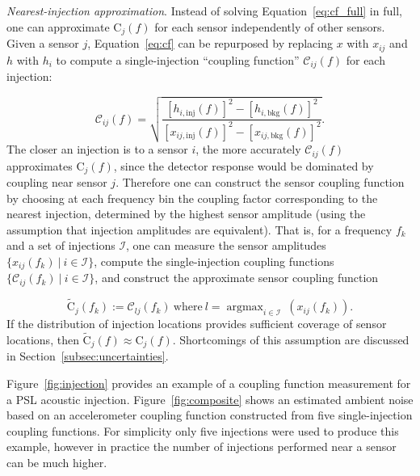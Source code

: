 \textit{Nearest-injection approximation}.
Instead of solving Equation~\ref{eq:cf_full} in full, one can approximate $\mathrm{C}_j(f)$ for each sensor independently of other sensors.
Given a sensor $j$, Equation~\ref{eq:cf} can be repurposed by replacing $x$ with $x_{ij}$ and $h$ with $h_i$ to compute a single-injection ``coupling function'' $\mathcal{C}_{ij}(f)$ for each injection:

\begin{equation}\label{eq:sicf}
	\mathcal{C}_{ij}(f) = \sqrt{\frac{[h_{i,\textrm{inj}}(f)]^2 - [h_{i,\textrm{bkg}}(f)]^2}{[x_{ij,\textrm{inj}}(f)]^2 - [x_{ij,\textrm{bkg}}(f)]^2}}.
\end{equation}
The closer an injection is to a sensor $i$, the more accurately $\mathcal{C}_{ij}(f)$ approximates $\mathrm{C}_j(f)$, since the detector response would be dominated by coupling near sensor $j$.
Therefore one can construct the sensor coupling function by choosing at each frequency bin the coupling factor corresponding to the nearest injection, determined by the highest sensor amplitude (using the assumption that injection amplitudes are equivalent).
That is, for a frequency $f_k$ and a set of injections $\mathcal{I}$, one can measure the sensor amplitudes $\{x_{ij}(f_k)\ |\ i \in \mathcal{I}\}$, compute the single-injection coupling functions $\{\mathcal{C}_{ij}(f_k)\ |\ i \in \mathcal{I}\}$, and construct the approximate sensor coupling function

\begin{equation}\label{eq:ccf}
	\widetilde{\mathrm{C}}_j(f_k) := \mathcal{C}_{lj}(f_k)\ \mathrm{where}\ l = \mathop{argmax}_{i\in\mathcal{I}}\ (x_{ij}(f_k)).
\end{equation}
If the distribution of injection locations provides sufficient coverage of sensor locations, then $\widetilde{\mathrm{C}}_j(f) \approx \mathrm{C}_j(f)$.
Shortcomings of this assumption are discussed in Section~\ref{subsec:uncertainties}.

Figure~\ref{fig:injection} provides an example of a coupling function measurement for a \ac{PSL} acoustic injection.
Figure~\ref{fig:composite} shows an estimated ambient noise based on an accelerometer coupling function constructed from five single-injection coupling functions.
For simplicity only five injections were used to produce this example, however in practice the number of injections performed near a sensor can be much higher.

